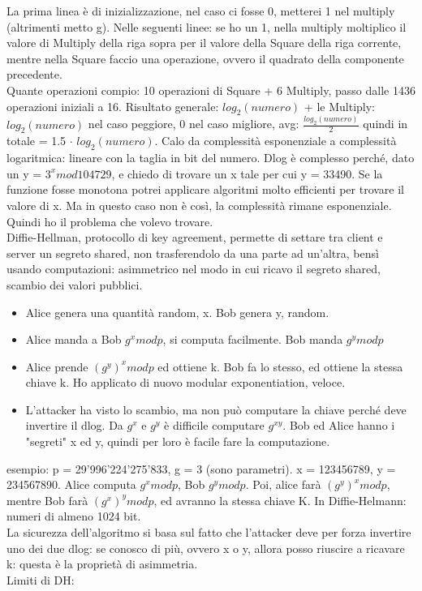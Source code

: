 \documentclass[16px]{article}
\begin{document}
La prima linea è di inizializzazione, nel caso ci fosse 0, metterei 1 nel multiply (altrimenti metto g). Nelle seguenti linee: se ho un 1, nella multiply moltiplico il valore di Multiply della riga sopra per il valore della Square della riga corrente, mentre nella Square faccio una operazione, ovvero il quadrato della componente precedente.\\ Quante operazioni compio: 10 operazioni di Square + 6 Multiply, passo dalle 1436 operazioni iniziali a 16. Risultato generale: $log_2(numero)$ + le Multiply: $log_2(numero)$ nel caso peggiore, 0 nel caso migliore, avg: $\frac{log_2(numero)}{2}$ quindi in totale = 1.5 $\cdot$ $log_2(numero)$. Calo da complessità esponenziale a complessità logaritmica: lineare con la taglia in bit del numero. Dlog è complesso perché, dato un y = $3^xmod104729$, e chiedo di trovare un x tale per cui y = 33490. Se la funzione fosse monotona potrei applicare algoritmi molto efficienti per trovare il valore di x. Ma in questo caso non è così, la complessità rimane esponenziale. Quindi ho il problema che volevo trovare.\\
Diffie-Hellman, protocollo di key agreement, permette di settare tra client e server un segreto shared, non trasferendolo da una parte ad un'altra, bensì usando computazioni: asimmetrico nel modo in cui ricavo il segreto shared, scambio dei valori pubblici.
\begin{itemize}
\item Alice genera una quantità random, x. Bob genera y, random.
\item Alice manda a Bob $g^xmodp$, si computa facilmente. Bob manda $g^ymodp$
\item Alice prende $(g^y)^xmodp$ ed ottiene k. Bob fa lo stesso, ed ottiene la stessa chiave k. Ho applicato di nuovo modular exponentiation, veloce.
\item L'attacker ha visto lo scambio, ma non può computare la chiave perché deve invertire il dlog. Da $g^x$ e $g^y$ è difficile computare $g^{xy}$. Bob ed Alice hanno i "segreti" x ed y, quindi per loro è facile fare la computazione.
\end{itemize}
esempio: p = 29'996'224'275'833, g = 3 (sono parametri). x = 123456789, y = 234567890. Alice computa $g^xmodp$, Bob $g^ymodp$. Poi, alice farà $(g^{y})^{x}modp$, mentre Bob farà $(g^{x})^{y}modp$, ed avranno la stessa chiave K. In Diffie-Helmann: numeri di almeno 1024 bit.\\ La sicurezza dell'algoritmo si basa sul fatto che l'attacker deve per forza invertire uno dei due dlog: se conosco di più, ovvero x o y, allora posso riuscire a ricavare k: questa è la proprietà di asimmetria.\\ Limiti di DH:
\end{document}
